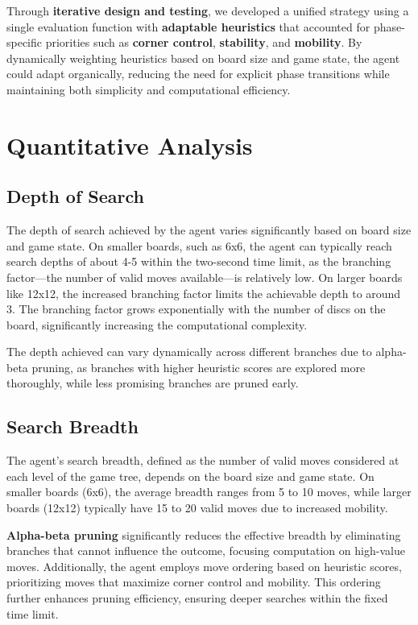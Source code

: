 \documentclass[11pt]{article}
\begin{document}
\noindent Through \textbf{iterative design and testing}, we developed a unified strategy using a single evaluation function with \textbf{adaptable heuristics} that accounted for phase-specific priorities such as \textbf{corner control}, \textbf{stability}, and \textbf{mobility}. By dynamically weighting heuristics based on board size and game state, the agent could adapt organically, reducing the need for explicit phase transitions while maintaining both simplicity and computational efficiency.

\section*{Quantitative Analysis}
\subsection*{Depth of Search}
The depth of search achieved by the agent varies significantly based on board size and game state. On smaller boards, such as 6x6, the agent can typically reach search depths of about 4-5 within the two-second time limit, as the branching factor—the number of valid moves available—is relatively low. On larger boards like 12x12, the increased branching factor limits the achievable depth to around 3. The branching factor grows exponentially with the number of discs on the board, significantly increasing the computational complexity.

\noindent The depth achieved can vary dynamically across different branches due to alpha-beta pruning, as branches with higher heuristic scores are explored more thoroughly, while less promising branches are pruned early. 

\subsection*{Search Breadth}
The agent’s search breadth, defined as the number of valid moves considered at each level of the game tree, depends on the board size and game state. On smaller boards (6x6), the average breadth ranges from 5 to 10 moves, while larger boards (12x12) typically have 15 to 20 valid moves due to increased mobility. 

\noindent \textbf{Alpha-beta pruning} significantly reduces the effective breadth by eliminating branches that cannot influence the outcome, focusing computation on high-value moves. Additionally, the agent employs move ordering based on heuristic scores, prioritizing moves that maximize corner control and mobility. This ordering further enhances pruning efficiency, ensuring deeper searches within the fixed time limit.
\end{document}
